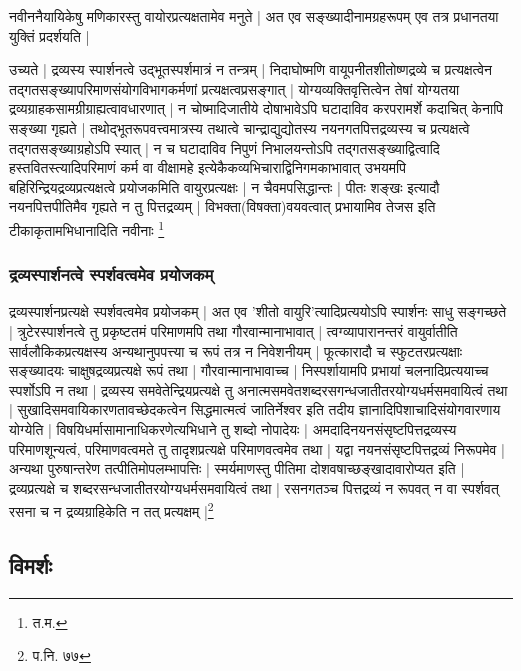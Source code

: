 नवीननैयायिकेषु मणिकारस्तु वायोरप्रत्यक्षतामेव मनुते | अत एव सङ्ख्यादीनामग्रहरूपम् एव तत्र प्रधानतया युक्तिं प्रदर्शयति |

{\fontsize{11.7}{0}\selectfont\s उच्यते | द्रव्यस्य स्पार्शनत्वे उद्भूतस्पर्शमात्रं न तन्त्रम् | निदाघोष्मणि वायूपनीतशीतोष्णद्रव्ये च प्रत्यक्षत्वेन तद्गतसङ्ख्यापरिमाणसंयोगविभागकर्मणां प्रत्यक्षत्वप्रसङ्गात् | योग्यव्यक्तिवृत्तित्वेन तेषां योग्यतया द्रव्यग्राहकसामग्रीग्राह्यत्वावधारणात् | न चोष्मादिजातीये दोषाभावेऽपि घटादाविव करपरामर्शे कदाचित् केनापि सङ्ख्या गृह्यते | तथोद्भूतरूपवत्त्वमात्रस्य तथात्वे चान्द्राद्युद्योतस्य नयनगतपित्तद्रव्यस्य च प्रत्यक्षत्वे तद्गतसङ्ख्याग्रहोऽपि स्यात् | न च घटादाविव निपुणं निभालयन्तोऽपि तद्गतसङ्ख्याद्वित्वादि हस्तवितस्त्यादिपरिमाणं कर्म वा वीक्षामहे इत्येकैकव्यभिचाराद्विनिगमकाभावात् उभयमपि बहिरिन्द्रियद्रव्यप्रत्यक्षत्वे प्रयोजकमिति वायुरप्रत्यक्षः | न चैवमपसिद्धान्तः | पीतः शङ्खः इत्यादौ नयनपित्तपीतिमैव गृह्यते न तु पित्तद्रव्यम् | विभक्ता(विषक्ता)वयवत्वात् प्रभायामिव तेजस इति टीकाकृतामभिधानादिति नवीनाः \footnote{त.म.}}

\subsubsection{द्रव्यस्पार्शनत्वे स्पर्शवत्वमेव प्रयोजकम्}

द्रव्यस्पार्शनप्रत्यक्षे स्पर्शवत्वमेव प्रयोजकम् | अत एव 'शीतो वायुरि'त्यादिप्रत्ययोऽपि स्पार्शनः साधु सङ्गच्छते | त्रुटेरस्पार्शनत्वे तु प्रकृष्टतमं परिमाणमपि तथा गौरवान्मानाभावात् |	त्वग्व्यापारानन्तरं वायुर्वातीति सार्वलौकिकप्रत्यक्षस्य अन्यथानुपपत्त्या च रूपं तत्र न निवेशनीयम् | फूत्कारादौ च स्फुटतरप्रत्यक्षाः सङ्ख्यादयः चाक्षुषद्रव्यप्रत्यक्षे रूपं तथा | गौरवान्मानाभावाच्च | निस्पर्शायामपि प्रभायां चलनादिप्रत्ययाच्च  स्पर्शोऽपि न तथा | द्रव्यस्य समवेतेन्द्रियप्रत्यक्षे तु अनात्मसमवेतशब्दरसगन्धजातीतरयोग्यधर्मसमवायित्वं तथा | सुखादिसमवायिकारणतावच्छेदकत्वेन सिद्धमात्मत्वं जातिर्नेश्वर इति तदीय ज्ञानादिपिशाचादिसंयोगवारणाय योग्येति | विषयिधर्मासामानाधिकरणेत्यभिधाने तु शब्दो नोपादेयः | अमदादिनयनसंसृष्टपित्तद्रव्यस्य परिमाणशून्यत्वं, परिमाणवत्वमते तु तादृशप्रत्यक्षे परिमाणवत्वमेव तथा | यद्वा नयनसंसृष्टपित्तद्रव्यं निरूपमेव | अन्यथा पुरुषान्तरेण तत्पीतिमोपलम्भापत्तिः | स्मर्यमाणस्तु पीतिमा दोशवषाच्छङ्खादावारोप्यत इति | द्रव्यप्रत्यक्षे च शब्दरसन्धजातीतरयोग्यधर्मसमवायित्वं तथा | रसनगतञ्च पित्तद्रव्यं न रूपवत् न वा स्पर्शवत् रसना च न द्रव्यग्राहिकेति न तत् प्रत्यक्षम् |\footnote{प.नि. ७७}

\subsection{विमर्शः}

